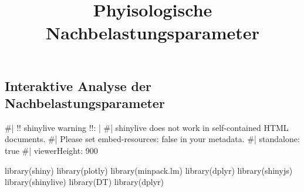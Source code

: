 \documentclass[
  letterpaper,
  DIV=11]{scrartcl}
\title{Phyisologische Nachbelastungsparameter}
\author{}
\date{}
\newenvironment{Shaded}{\begin{snugshade}}{\end{snugshade}}
\newcommand{\NormalTok}[1]{\textcolor[rgb]{0.00,0.23,0.31}{#1}}
\begin{document}
\maketitle

\subsection{Interaktive Analyse der
Nachbelastungsparameter}\label{interaktive-analyse-der-nachbelastungsparameter}

\begin{Shaded}
\begin{Highlighting}[]
\NormalTok{\#| \textquotesingle{}!! shinylive warning !!\textquotesingle{}: |}
\NormalTok{\#|   shinylive does not work in self{-}contained HTML documents.}
\NormalTok{\#|   Please set \textasciigrave{}embed{-}resources: false\textasciigrave{} in your metadata.}
\NormalTok{\#| standalone: true}
\NormalTok{\#| viewerHeight: 900}

\NormalTok{library(shiny)}
\NormalTok{library(plotly)}
\NormalTok{library(minpack.lm)}
\NormalTok{library(dplyr)}
\NormalTok{library(shinyjs)}
\NormalTok{library(shinylive)}
\NormalTok{library(DT)}
\NormalTok{library(dplyr)}


\end{Highlighting}
\end{Shaded}
\end{document}
